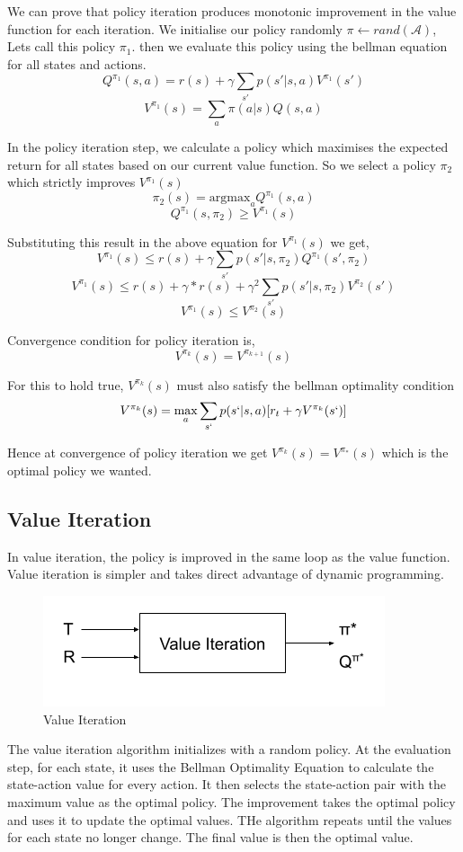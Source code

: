 \documentclass[11pt]{article}
\begin{document}
We can prove that policy iteration produces monotonic improvement in the value function for each iteration. We initialise our policy randomly $\pi \gets rand(\mathcal{A})$, Lets call this policy $\pi_1$. then we evaluate this policy using the bellman equation for all states and actions.
$$Q^{\pi_1}(s,a) = r(s) + \gamma \sum\limits_{s'} p(s'|s,a)V^{\pi_1}(s') $$
$$ V^{\pi_1}(s) = \sum_a \pi(a|s)Q(s,a)  $$

In the policy iteration step, we calculate a policy which maximises the expected return for all states based on our current value function. So we select a policy $\pi_2$ which strictly improves $V^{\pi_1}(s)$
$$ \pi_2(s) = \text{argmax}_a Q^{\pi_1}(s,a)$$
$$ Q^{\pi_1}(s,\pi_2) \geq V^{\pi_1}(s)  $$

Substituting this result in the above equation for $V^{\pi_1}(s) $ we get,
$$ V^{\pi_1}(s) \leq  r(s) + \gamma \sum\limits_{s'} p(s'|s,\pi_2)Q^{\pi_1}(s',\pi_2) $$
$$ V^{\pi_1}(s) \leq  r(s) + \gamma*r(s) + \gamma^2 \sum\limits_{s'} p(s'|s,\pi_2)V^{\pi_2}(s') $$
$$ V^{\pi_1}(s) \leq V^{\pi_2}(s) $$

Convergence condition for policy iteration is,
$$ V^{\pi_k}(s) = V^{\pi_{k+1}}(s) $$

For this to hold true, $V^{\pi_k}(s) $ must also satisfy the bellman optimality condition
$$ V^{\pi_k}(s) = \max_a \sum_{s`} p(s`|s,a)[r_t + \gamma V^{\pi_k}(s`)] $$

Hence at convergence of policy iteration we get $ V^{\pi_k}(s) = V^{\pi_*}(s) $ which is the optimal policy we wanted.



\subsection{Value Iteration}
In value iteration, the policy is improved in the same loop as the value function.
Value iteration is simpler and takes direct advantage of dynamic programming.
\begin{figure}[H]
    \centering
    \includegraphics[width=0.4\linewidth]{Value iteration.png}
    \caption{Value Iteration}
    \label{fig:my_label}
\end{figure}

The value iteration algorithm initializes with a random policy. At the evaluation step, for each state, it uses the Bellman Optimality Equation to calculate the state-action value for every action. It then selects the state-action pair with the maximum value as the optimal policy. The improvement takes the optimal policy and uses it to update the optimal values. THe algorithm repeats until the values for each state no longer change. The final value is then the optimal value.
\end{document}
